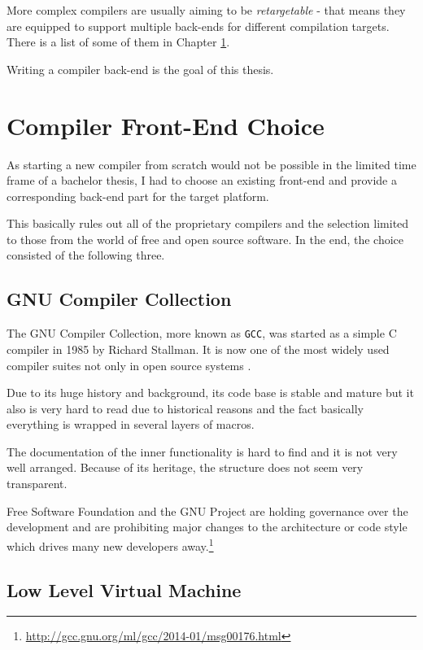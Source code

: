         More complex compilers are usually aiming to be \emph{retargetable} - that means they are equipped to support multiple back-ends for different compilation targets. There is a list of some of them in Chapter \ref{compiler}.

        Writing a compiler back-end is the goal of this thesis.

\chapter{Compiler Front-End Choice}\label{compiler}

As starting a new compiler from scratch would not be possible in the limited time frame of a bachelor thesis, I had to choose an existing front-end and provide a corresponding back-end part for the target platform.

This basically rules out all of the proprietary compilers and the selection limited to those from the world of free and open source software. In the end, the choice consisted of the following three.

    \section{GNU Compiler Collection}\label{gcc}

    The GNU Compiler Collection, more known as \texttt{GCC}, was started as a simple C compiler in 1985 by Richard Stallman. It is now one of the most widely used compiler suites not only in open source systems \cite{GccWeb}.

    Due to its huge history and background, its code base is stable and mature but it also is very hard to read due to historical reasons and the fact basically everything is wrapped in several layers of macros.

    The documentation of the inner functionality is hard to find and it is not very well arranged. Because of its heritage, the structure does not seem very transparent.

    Free Software Foundation and the GNU Project are holding governance over the development and are prohibiting major changes to the architecture or code style which drives many new developers away.\footnote{\url{http://gcc.gnu.org/ml/gcc/2014-01/msg00176.html}}

    \section{Low Level Virtual Machine}\label{llvm}

